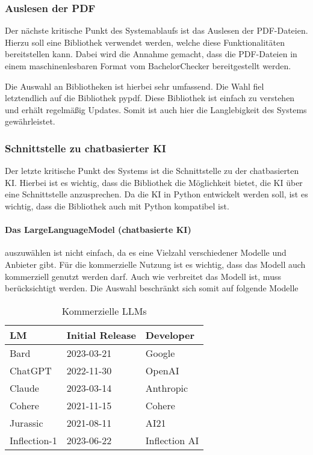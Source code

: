 \subsubsection{Auslesen der PDF}\label{subsubsec:pdf}
Der nächste kritische Punkt des Systemablaufs ist das Auslesen der PDF-Dateien.
Hierzu soll eine Bibliothek verwendet werden, welche diese Funktionalitäten bereitstellen kann.
Dabei wird die Annahme gemacht, dass die PDF-Dateien in einem maschinenlesbaren Format vom BachelorChecker bereitgestellt werden.

Die Auswahl an Bibliotheken ist hierbei sehr umfassend.
Die Wahl fiel letztendlich auf die Bibliothek pypdf.
Diese Bibliothek ist einfach zu verstehen und erhält regelmäßig Updates.
Somit ist auch hier die Langlebigkeit des Systems gewährleistet.

\subsubsection{Schnittstelle zu chatbasierter KI}\label{subsubsec:ki}
Der letzte kritische Punkt des Systems ist die Schnittstelle zu der chatbasierten KI.
Hierbei ist es wichtig, dass die Bibliothek die Möglichkeit bietet, die KI über eine Schnittstelle anzusprechen.
Da die KI in Python entwickelt werden soll, ist es wichtig, dass die Bibliothek auch mit Python kompatibel ist.

\paragraph{Das LargeLanguageModel (chatbasierte KI)} auszuwählen ist nicht einfach,
da es eine Vielzahl verschiedener Modelle und Anbieter gibt.
Für die kommerzielle Nutzung ist es wichtig, dass das Modell auch kommerziell genutzt werden darf.
Auch wie verbreitet das Modell ist, muss berücksichtigt werden.
Die Auswahl beschränkt sich somit auf folgende Modelle

\begin{table}[H]
    \begin{tabularx}{\textwidth}{lll}
        \toprule
        \textbf{LM}  & \textbf{Initial Release} & \textbf{Developer} \\
        \midrule
        Bard         & 2023-03-21               & Google             \\
        ChatGPT      & 2022-11-30               & OpenAI             \\
        Claude       & 2023-03-14               & Anthropic          \\
        Cohere       & 2021-11-15               & Cohere             \\
        Jurassic     & 2021-08-11               & AI21               \\
        Inflection-1 & 2023-06-22               & Inflection AI      \\
        \bottomrule
    \end{tabularx}
    \caption{Kommerzielle LLMs}\autocite{sapling.llmindex}
    \label{tab:kommerzielle-llms}
\end{table}

